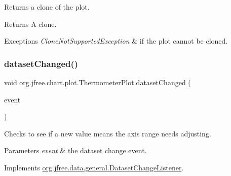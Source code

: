 Returns a clone of the plot.

\begin{DoxyReturn}{Returns}
A clone.
\end{DoxyReturn}

\begin{DoxyExceptions}{Exceptions}
{\em Clone\+Not\+Supported\+Exception} & if the plot cannot be cloned. \\
\hline
\end{DoxyExceptions}
\mbox{\label{classorg_1_1jfree_1_1chart_1_1plot_1_1_thermometer_plot_aba0587d6e40888042aef46c570fc1237}} 
\subsubsection{\texorpdfstring{dataset\+Changed()}{datasetChanged()}}
{\footnotesize\ttfamily void org.\+jfree.\+chart.\+plot.\+Thermometer\+Plot.\+dataset\+Changed (\begin{DoxyParamCaption}\item[{\mbox{\hyperlink{classorg_1_1jfree_1_1data_1_1general_1_1_dataset_change_event}{Dataset\+Change\+Event}}}]{event }\end{DoxyParamCaption})}

Checks to see if a new value means the axis range needs adjusting.


\begin{DoxyParams}{Parameters}
{\em event} & the dataset change event. \\
\hline
\end{DoxyParams}


Implements \mbox{\hyperlink{interfaceorg_1_1jfree_1_1data_1_1general_1_1_dataset_change_listener_a26ca53969f0dfa539f52e846a3cd72fe}{org.\+jfree.\+data.\+general.\+Dataset\+Change\+Listener}}.

\mbox{\label{classorg_1_1jfree_1_1chart_1_1plot_1_1_thermometer_plot_a8d5c0c667c02b8ce4db1f8e55ace5cb0}} 
